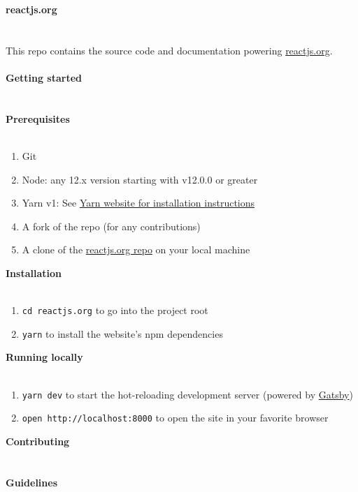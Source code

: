 \documentclass{article}
\begin{document}
{\noindent \Huge \textbf{reactjs.org}}\\\\
\\
This repo contains the source code and documentation powering \href{https://reactjs.org/}{reactjs.org}.\\
\\
{\noindent \LARGE \textbf{Getting started}}\\\\
\\
{\noindent \Large \textbf{Prerequisites}}\\\\
\begin{enumerate}[label=\arabic*.]
	\item Git
	\item Node: any 12.x version starting with v12.0.0 or greater
	\item Yarn v1: See \href{https://yarnpkg.com/lang/en/docs/install/}{Yarn website for installation instructions}
	\item A fork of the repo (for any contributions)
	\item A clone of the \href{https://github.com/reactjs/reactjs.org}{reactjs.org repo} on your local machine
\end{enumerate}
{\noindent \Large \textbf{Installation}}\\\\
\begin{enumerate}[label=\arabic*.]
	\item \verb|cd reactjs.org| to go into the project root
	\item \verb|yarn| to install the website's npm dependencies
\end{enumerate}
{\noindent \Large \textbf{Running locally}}\\\\
\begin{enumerate}[label=\arabic*.]
	\item \verb|yarn dev| to start the hot-reloading development server (powered by \href{https://www.gatsbyjs.org}{Gatsby})
	\item \verb|open http://localhost:8000| to open the site in your favorite browser
\end{enumerate}
{\noindent \LARGE \textbf{Contributing}}\\\\
\\
{\noindent \Large \textbf{Guidelines}}\\\\
\end{document}
